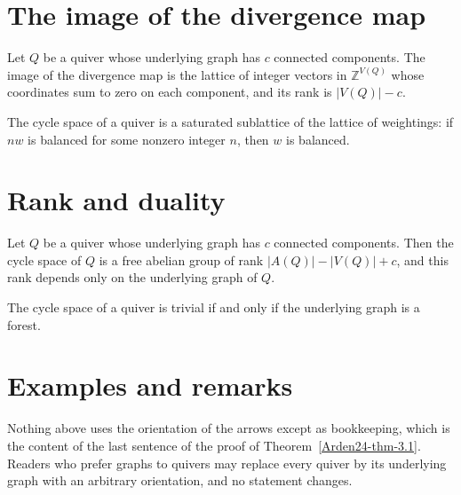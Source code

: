 \section{The image of the divergence map}\label{Arden24-sec-2}

\begin{proposition}\label{Arden24-prop-2.1}
\label{Arden24-prop:image}
Let $Q$ be a quiver whose underlying graph has $c$ connected components. The image of the divergence map is the lattice of integer vectors in $\mathbb{Z}^{V(Q)}$ whose coordinates sum to zero on each component, and its rank is $|V(Q)| - c$.
\end{proposition}

\begin{lemma}\label{Arden24-lem-2.2}
\label{Arden24-lem:saturated}
The cycle space of a quiver is a saturated sublattice of the lattice of weightings: if $nw$ is balanced for some nonzero integer $n$, then $w$ is balanced.
\end{lemma}

\section{Rank and duality}\label{Arden24-sec-3}

\begin{theorem}\label{Arden24-thm-3.1}
\label{Arden24-thm:rank}
Let $Q$ be a quiver whose underlying graph has $c$ connected components. Then the cycle space of $Q$ is a free abelian group of rank $|A(Q)| - |V(Q)| + c$, and this rank depends only on the underlying graph of $Q$.
\end{theorem}

\begin{corollary}\label{Arden24-cor-3.2}
\label{Arden24-cor:forest}
The cycle space of a quiver is trivial if and only if the underlying graph is a forest.
\end{corollary}

\section{Examples and remarks}\label{Arden24-sec-4}

\begin{remark}\label{Arden24-rem-4.1}
\label{Arden24-rem:orientation}
Nothing above uses the orientation of the arrows except as bookkeeping, which is the content of the last sentence of the proof of Theorem~\ref{Arden24-thm-3.1}. Readers who prefer graphs to quivers may replace every quiver by its underlying graph with an arbitrary orientation, and no statement changes.
\end{remark}

